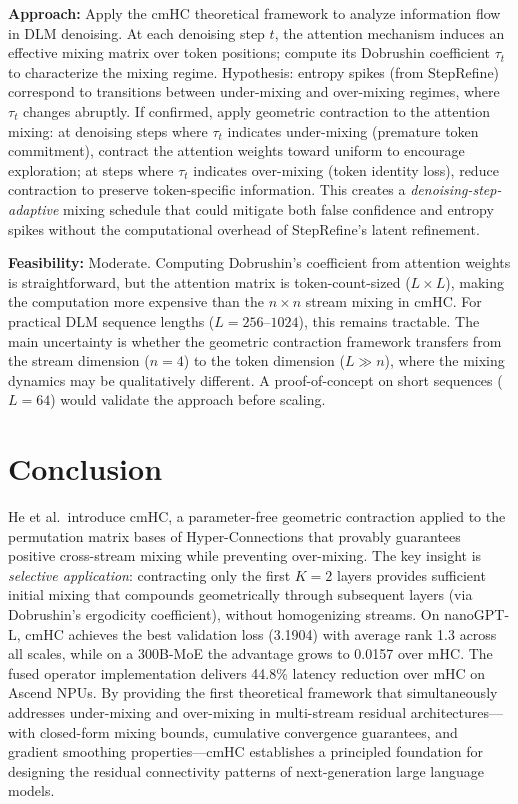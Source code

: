 \documentclass[11pt,a4paper]{article}
\begin{document}
\textbf{Approach:} Apply the cmHC theoretical framework to analyze information flow in DLM denoising. At each denoising step $t$, the attention mechanism induces an effective mixing matrix over token positions; compute its Dobrushin coefficient $\tau_t$ to characterize the mixing regime. Hypothesis: entropy spikes (from StepRefine) correspond to transitions between under-mixing and over-mixing regimes, where $\tau_t$ changes abruptly. If confirmed, apply geometric contraction to the attention mixing: at denoising steps where $\tau_t$ indicates under-mixing (premature token commitment), contract the attention weights toward uniform to encourage exploration; at steps where $\tau_t$ indicates over-mixing (token identity loss), reduce contraction to preserve token-specific information. This creates a \emph{denoising-step-adaptive} mixing schedule that could mitigate both false confidence and entropy spikes without the computational overhead of StepRefine's latent refinement.

\textbf{Feasibility:} Moderate. Computing Dobrushin's coefficient from attention weights is straightforward, but the attention matrix is token-count-sized ($L \times L$), making the computation more expensive than the $n \times n$ stream mixing in cmHC. For practical DLM sequence lengths ($L{=}256$--$1024$), this remains tractable. The main uncertainty is whether the geometric contraction framework transfers from the stream dimension ($n{=}4$) to the token dimension ($L \gg n$), where the mixing dynamics may be qualitatively different. A proof-of-concept on short sequences ($L{=}64$) would validate the approach before scaling.

\section{Conclusion}
He et al.\ introduce cmHC, a parameter-free geometric contraction applied to the permutation matrix bases of Hyper-Connections that provably guarantees positive cross-stream mixing while preventing over-mixing. The key insight is \emph{selective application}: contracting only the first $K{=}2$ layers provides sufficient initial mixing that compounds geometrically through subsequent layers (via Dobrushin's ergodicity coefficient), without homogenizing streams. On nanoGPT-L, cmHC achieves the best validation loss (3.1904) with average rank 1.3 across all scales, while on a 300B-MoE the advantage grows to 0.0157 over mHC. The fused operator implementation delivers 44.8\% latency reduction over mHC on Ascend NPUs. By providing the first theoretical framework that simultaneously addresses under-mixing and over-mixing in multi-stream residual architectures---with closed-form mixing bounds, cumulative convergence guarantees, and gradient smoothing properties---cmHC establishes a principled foundation for designing the residual connectivity patterns of next-generation large language models.
\end{document}
